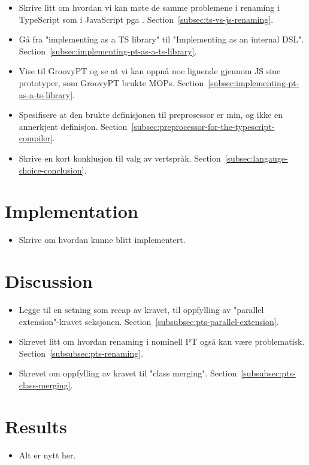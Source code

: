 \begin{itemize}
    \item Skrive litt om hvordan vi kan møte de samme problemene i renaming i TypeScript som i JavaScript pga .
    Section~\vref{subsec:ts-vs-js-renaming}.
    \item Gå fra "implementing as a TS library" til "Implementing as an internal DSL".
    Section~\vref{subsec:implementing-pt-as-a-ts-library}.
    \item Vise til GroovyPT og se at vi kan oppnå noe lignende gjennom JS sine prototyper, som GroovyPT brukte MOPs.
    Section~\vref{subsec:implementing-pt-as-a-ts-library}.
    \item Spesifisere at den brukte definisjonen til preprosessor er min, og ikke en annerkjent definisjon.
    Section~\vref{subsec:preprocessor-for-the-typescript-compiler}.
    \item Skrive en kort konklusjon til valg av vertspråk.
    Section~\vref{subsec:langauge-choice-conclusion}.
\end{itemize}

\section*{Implementation}

\begin{itemize}
    \item Skrive om hvordan  kunne blitt implementert.
\end{itemize}

\section*{Discussion}

\begin{itemize}
    \item Legge til en setning som recap av kravet, til oppfylling av "parallel extension"-kravet seksjonen.
    Section~\vref{subsubsec:pts-parallel-extension}.
    \item Skrevet litt om hvordan renaming i nominell PT også kan være problematisk.
    Section~\vref{subsubsec:pts-renaming}.
    \item Skrevet om oppfylling av kravet til "class merging".
    Section~\vref{subsubsec:pts-class-merging}.
\end{itemize}

\section*{Results}

\begin{itemize}
    \item Alt er nytt her.
\end{itemize}
